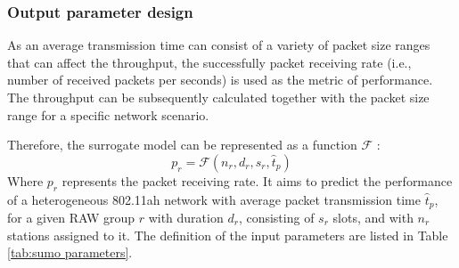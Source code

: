  \subsubsection{Output parameter design \label{subsec:output_para_design}}

 As an average transmission time can
consist of a variety of packet size ranges that can affect
the throughput, the successfully packet receiving rate (i.e.,
number of received packets per seconds) is used as the metric of 
performance. The throughput can be subsequently calculated
together with the packet size range for a specific network
scenario.
 

 
 





Therefore, the surrogate model can be represented as a function  $\mathcal{F}$ :
\begin{equation} \label{eq:raw_model}
p_r = \mathcal{F}(n_r, d_r, s_r, \hat{t}_p) 
\end{equation}
Where $p_r$ represents the packet receiving rate. It aims to predict the performance of a heterogeneous 802.11ah network with average packet transmission time $\hat{t}_p$, for a given RAW group $r$ with duration $d_r$, consisting of $s_r$ slots, and with $n_r$ stations assigned to it. The definition of the input parameters are listed in Table \ref{tab:sumo parameters}.

